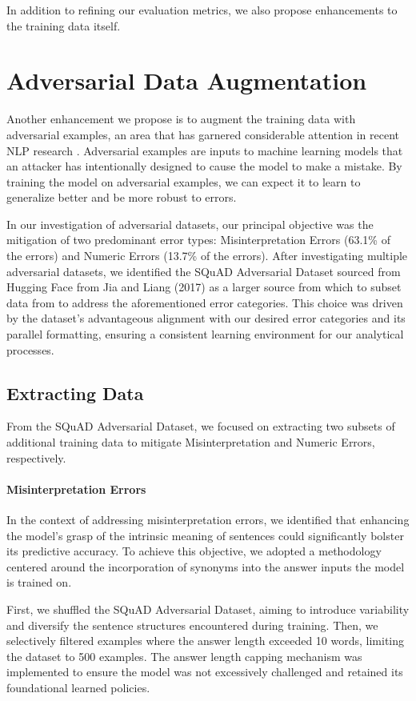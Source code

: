 \documentclass{article}
\begin{document}
In addition to refining our evaluation metrics, we also propose
enhancements to the training data itself.

\section{Adversarial Data Augmentation}
Another enhancement we propose is to augment the training data
with adversarial examples, an area that has garnered
considerable attention in recent NLP research
\cite{jia2017adversarial,liu2020adversarial,wallace2019universal}.
Adversarial examples are inputs to machine
learning models that an attacker has intentionally designed to cause
the model to make a mistake. By training the model on adversarial
examples, we can expect it to learn to generalize better and be more
robust to errors.

In our investigation of adversarial datasets, our principal objective
was the mitigation of two predominant error types: Misinterpretation
Errors (63.1\% of the errors) and Numeric Errors (13.7\% of the errors).
After investigating multiple adversarial datasets, we identified the
SQuAD Adversarial Dataset sourced from Hugging Face from Jia and Liang (2017)
as a larger source from which to subset data from to address the aforementioned error
categories. This choice was driven by the dataset's advantageous
alignment with our desired error categories and its parallel formatting,
ensuring a consistent learning environment for our analytical processes.

\subsection{Extracting Data}
From the SQuAD Adversarial Dataset, we focused on extracting
two subsets of additional training data to mitigate
Misinterpretation and Numeric Errors, respectively.

\paragraph{Misinterpretation Errors}
In the context of addressing misinterpretation errors, we
identified that enhancing the model's grasp of the intrinsic
meaning of sentences could significantly bolster its predictive
accuracy. To achieve this objective, we adopted a methodology
centered around the incorporation of synonyms into the answer
inputs the model is trained on.

First, we shuffled the SQuAD Adversarial Dataset, aiming to
introduce variability and diversify the sentence structures
encountered during training. Then, we selectively filtered
examples where the answer length exceeded 10 words, limiting
the dataset to 500 examples. The answer length capping
mechanism was implemented to ensure the model was not
excessively challenged and retained its foundational learned
policies.
\end{document}

